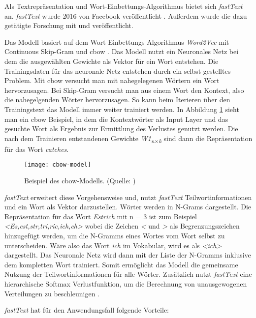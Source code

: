Als Textrepräsentation und Wort-Einbettungs-Algorithmus bietet sich \textit{fastText} an. \textit{fastText} wurde 2016 von Facebook veröffentlicht \citep{fastText_release2016}. Außerdem wurde die dazu getätigte Forschung mit \cite{bojanowski2017enriching} und \cite{joulin2016bag} veröffentlicht.

Das Modell basiert auf dem Wort-Einbettungs Algorithmus \textit{Word2Vec} mit \glqq Continuous Skip-Gram\grqq{} und \ac{cbow} \citep{bojanowski2017enriching}. Das Modell nutzt ein Neuronales Netz bei dem die ausgewählten Gewichte als Vektor für ein Wort entstehen. Die Trainingsdaten für das neuronale Netz entstehen durch ein selbst gestelltes Problem. Mit \ac{cbow} versucht man mit nahegelegenen Wörtern ein Wort hervorzusagen. Bei Skip-Gram versucht man aus einem Wort den Kontext, also die nahegelgenden Wörter hervorzusagen. So kann beim Iterieren über den Trainingstext das Modell immer weiter trainiert werden. In Abbildung \ref{fig:cbow} sieht man ein \ac{cbow} Beispiel, in dem die Kontextwörter als Input Layer und das gesuchte Wort als Ergebnis zur Ermittlung des Verlustes genutzt werden. Die nach dem Trainieren entstandenen Gewichte \textit{W1\textsubscript{n$\times $k}}\: sind dann die Repräsentation für das Wort \textit{catches}.
\begin{figure}[h]
	\centering
	\texttt{[image: cbow-model]}
	\caption[CBOW]{Beispiel des \ac{cbow}-Modells. (Quelle:  \cite{cbow_image})}
	\label{fig:cbow}
\end{figure}
\textit{fastText} erweitert diese Vorgehensweise und, nutzt \textit{fastText} Teilwortinformationen und ein Wort als Vektor darzustellen. Wörter werden in N-Grams dargestellt. \citep{bojanowski2017enriching} Die Repräsentation für das Wort \textit{Estrich} mit n = 3 ist zum Beispiel \textit{<Es,est,str,tri,ric,ich,ch>} wobei die Zeichen \textit{<} und \textit{>} als Begrenzungszeichen hinzugefügt werden, um die N-Gramms eines Wortes vom Wort selbst zu unterscheiden. Wäre also das Wort \textit{ich} im Vokabular, wird es als \textit{<ich>} dargestellt. Das Neuronale Netz wird dann mit der Liste der N-Gramms inklusive dem kompletten Wort trainiert. Somit ermöglicht das Modell die gemeinsame Nutzung der Teilwortinformationen für alle Wörter\citep{bojanowski2017enriching}. Zusätzlich nutzt \textit{fastText} eine hierarchische Softmax Verlustfunktion, um die Berechnung von unausgewogenen Verteilungen zu beschleunigen \citep{fastText_release2016}.

\textit{fastText} hat für den Anwendungsfall folgende Vorteile:

